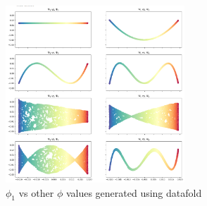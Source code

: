 \begin{figure}[H]
    \centering
    \includegraphics[width=0.6\textwidth]{images/ex3task2_datafold.png}
    \caption{$\phi_1$ vs other $\phi$ values generated using datafold}
    \label{fig:task2_datafold}
\end{figure}



